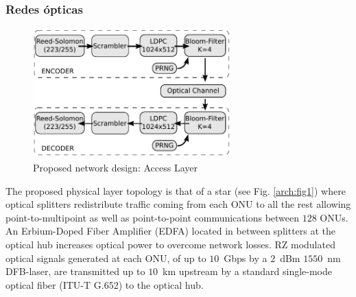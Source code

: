 \documentclass[a4paper,10pt]{report}
\begin{document}
\subsubsection{Redes ópticas}
\begin{figure}[!t]
  \centering
    \includegraphics[width=3in]{orte01.pdf}
    \caption{Proposed network design: Access Layer}
    \label{arch:chain}
\end{figure}

The proposed physical layer topology is that of a star (see Fig.
\ref{arch:fig1}) where optical splitters redistribute traffic coming
from each ONU to all the rest allowing point-to-multipoint as well as
point-to-point communications between $128$ ONUs.
An Erbium-Doped Fiber Amplifier (EDFA) located in between splitters at
the optical hub increases optical power to overcome network losses.  RZ
modulated optical signals generated at each ONU, of up to $10$~Gbps by a
$2$~dBm $1550$~nm DFB-laser, are transmitted up to $10$~km upstream by a
standard single-mode optical fiber (ITU-T G.652) to the optical hub.
\end{document}
